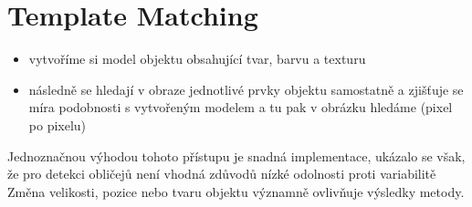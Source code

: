 \section{Template Matching}
\begin{itemize}
    \item vytvoříme si model objektu obsahující tvar, barvu a texturu
    \item následně se hledají v obraze jednotlivé prvky objektu samostatně a zjišťuje se míra podobnosti s vytvořeným modelem a tu pak v obrázku hledáme (pixel po pixelu)
\end{itemize}
Jednoznačnou výhodou tohoto přístupu je snadná implementace, ukázalo se však, že pro detekci obličejů není vhodná zdůvodů nízké odolnosti proti variabilitě
Změna velikosti, pozice nebo tvaru objektu významně ovlivňuje výsledky metody.

